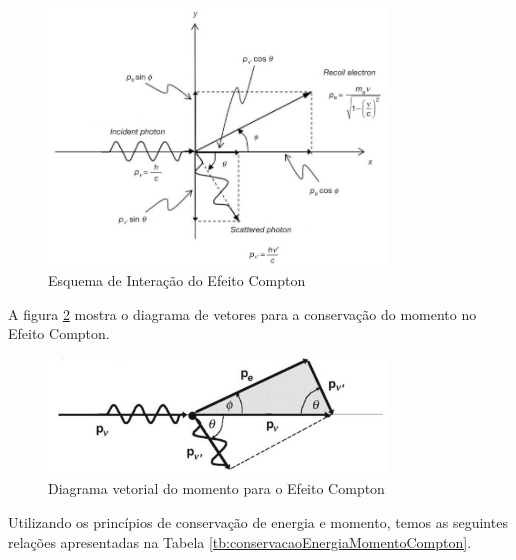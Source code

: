 \documentclass[11pt,a4paper]{article}
\begin{document}
                \begin{figure}[h]
                    \centering
                    \includegraphics[width=0.8\textwidth]{Imagens/esquemaEfeitoCompton.JPG}
                    \caption{Esquema de Interação do Efeito Compton}
                    \label{fig:esquemaEfeitoCompton}
                \end{figure}

            A figura \ref{fig:diagramaMomentoEfeitoCompton} mostra o diagrama de vetores para a conservação do momento no Efeito Compton.

                \begin{figure}[h]
                    \centering
                    \includegraphics[width=0.8\textwidth]{Imagens/esquemaVetorialMomentoEfeitoCompton.jpg}
                    \caption{Diagrama vetorial do momento para o Efeito Compton}
                    \label{fig:diagramaMomentoEfeitoCompton}
                \end{figure}


            Utilizando os princípios de conservação de energia e momento, temos as seguintes relações apresentadas na Tabela \ref{tb:conservacaoEnergiaMomentoCompton}.
\end{document}
